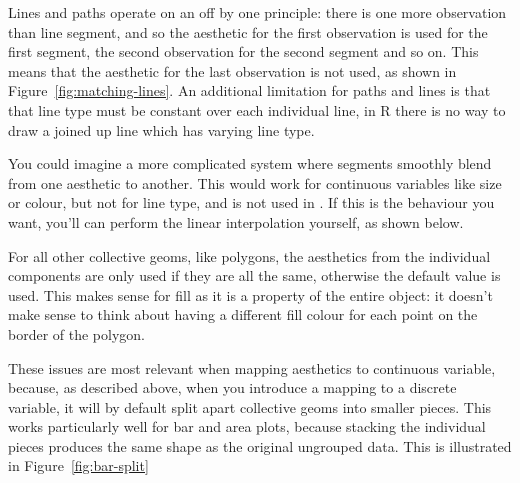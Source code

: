 Lines and paths operate on an off by one principle: there is one more observation than line segment, and so the aesthetic for the first observation is used for the first segment, the second observation for the second segment and so on.  This means that the aesthetic for the last observation is not used, as shown in Figure~\ref{fig:matching-lines}.  An additional limitation for paths and lines is that that line type must be constant over each individual line, in R there is no way to draw a joined up line which has varying line type.

% 


You could imagine a more complicated system where segments smoothly blend from one aesthetic to another.  This would work for continuous variables like size or colour, but not for line type, and is not used in \ggplot.  If this is the behaviour you want, you'll can perform the linear interpolation yourself, as shown below.  

% 


For all other collective geoms, like polygons, the aesthetics from the individual components are only used if they are all the same, otherwise the default value is used.  This makes sense for fill as it is a property of the entire object: it doesn't make sense to think about having a different fill colour for each point on the border of the polygon.

These issues are most relevant when mapping aesthetics to continuous variable, because, as described above, when you introduce a mapping to a discrete variable, it will by default split apart collective geoms into smaller pieces.  This works particularly well for bar and area plots, because stacking the individual pieces produces the same shape as the original ungrouped data.  This is illustrated in Figure~\ref{fig:bar-split}

